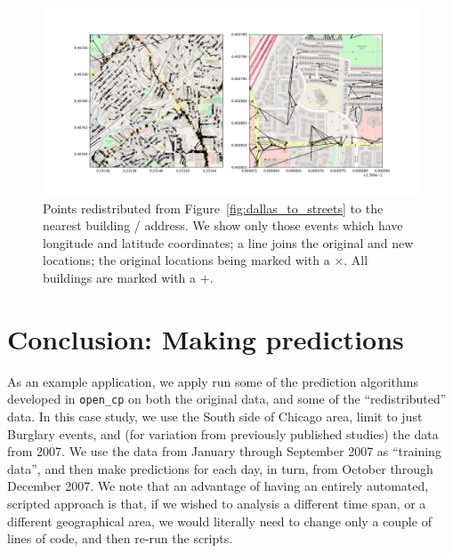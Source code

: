 \documentclass[twoside,a4paper,twocolumn,10pt]{article}
\theoremstyle{plain}
\theoremstyle{definition}
\begin{document}
\begin{figure}
  \includegraphics[width=\textwidth]{dallas_redist_to_buildings.png}
  \caption{Points redistributed from Figure~\ref{fig:dallas_to_streets} to the nearest
building / address.  We show only those events which have longitude and latitude coordinates;
a line joins the original and new locations; the original locations being marked with a
$\times$.  All buildings are marked with a $+$.}
  \label{fig:dallas_to_buildings}
\end{figure}




\section{Conclusion: Making predictions}\label{sec:preds}

As an example application, we apply run some of the prediction algorithms developed in
\texttt{open\_cp} on both the original data, and some of the ``redistributed'' data.
In this case study, we use the South side of Chicago area, limit to just Burglary events,
and (for variation from
previously published studies) the data from 2007.  We use the data from January through
September 2007 as ``training data'', and then make predictions for each day, in turn, from
October through December 2007.  We note that an advantage of having an entirely automated,
scripted approach is that, if we wished to analysis a different time span, or a different
geographical area, we would literally need to change only a couple of lines of code, and
then re-run the scripts.
\end{document}
